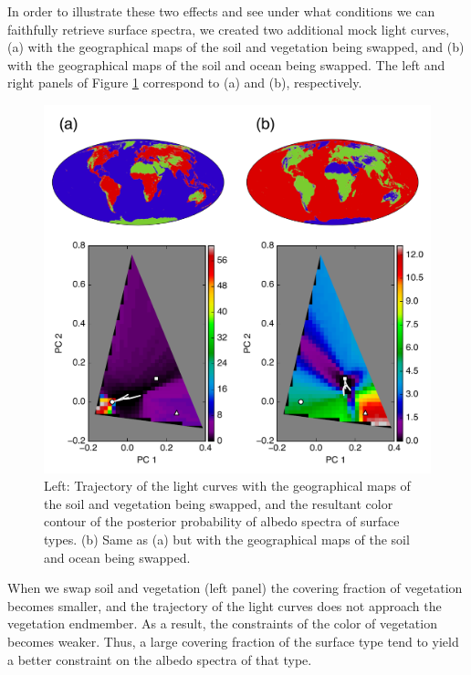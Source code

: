 \documentclass[iop,numberedappendix,apj]{emulateapj}
\begin{document}
In order to illustrate these two effects and see under what conditions we can faithfully retrieve surface spectra, we created two additional mock light curves, (a) with the geographical maps of the soil and vegetation being swapped, and  (b) with the geographical maps of the soil and ocean being swapped. 
The left and right panels of Figure \ref{fig:swap} correspond to (a) and (b), respectively. 

\begin{figure}[htb!]
    \begin{center}
    \includegraphics[width=\hsize]{swap.pdf}
    \end{center}
    \caption{Left: Trajectory of the light curves with the geographical maps of the soil and vegetation being swapped, and the resultant color contour of the posterior probability of albedo spectra of surface types. (b) Same as (a) but with the geographical maps of the soil and ocean being swapped.}
\label{fig:swap}
\end{figure}

When we swap soil and vegetation (left panel) the covering fraction of vegetation becomes smaller, and the trajectory of the light curves does not approach the vegetation endmember. As a result, the constraints of the color of vegetation becomes weaker. Thus, a large covering fraction of the surface type tend to yield a better constraint on the albedo spectra of that type. 
\end{document}
